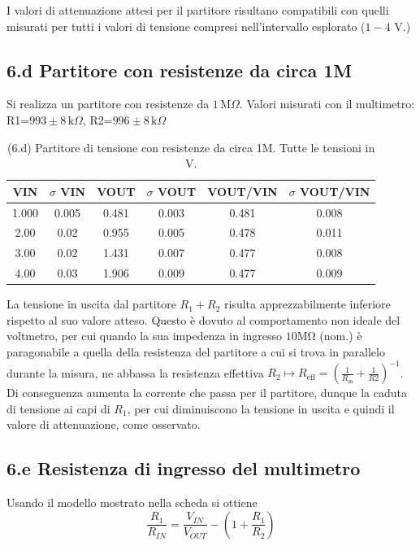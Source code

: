 \documentclass[10pt, a4paper, italian]{article}
\begin{document}
I valori di attenuazione attesi per il partitore risultano compatibili
con quelli misurati per tutti i valori di tensione compresi nell'intervallo
esplorato ($1 - 4$ V.)

\subsection*{6.d Partitore con resistenze da circa 1M}
\par
Si realizza un partitore con resistenze da $1 \,\mathrm{M}\Omega$.
Valori misurati con il multimetro: R1=$993 \pm 8 \,\mathrm{k}\Omega$,
R2=$996 \pm 8 \,\mathrm{k}\Omega$


\begin{table}[h]
\centering
\begin{tabular}{|c|c|c|c|c|c|}
\hline 
VIN& $\sigma$ VIN  &VOUT	 & $\sigma$ VOUT& VOUT/VIN & $\sigma$ VOUT/VIN \\
\hline 
1.000 & 0.005 & 0.481 & 0.003 & 0.481 & 0.008 \\
2.00 & 0.02 & 0.955 & 0.005 & 0.478 & 0.011 \\
3.00 & 0.02 & 1.431 & 0.007 & 0.477 & 0.008 \\
4.00 & 0.03 & 1.906 & 0.009 & 0.477 & 0.009 \\
\hline 
\end{tabular} 
\caption{(6.d) Partitore di tensione con resistenze da circa 1M.
Tutte le tensioni in V.\label{tab:div1M}}
\end{table}

La tensione in uscita dal partitore $R_1 + R_2$ risulta apprezzabilmente
inferiore rispetto al suo valore atteso. Questo è dovuto al comportamento
non ideale del voltmetro, per cui quando la sua impedenza in ingresso
$10 \si{\Mohm}$ (nom.) è paragonabile a quella della resistenza del partitore
a cui si trova in parallelo durante la misura, ne abbassa la resistenza
effettiva $R_2 \mapsto R_{\mathrm{eff}} = (\frac{1}{R_{\mathrm{in}}}
+ \frac{1}{R2})^{-1}$. Di conseguenza aumenta la corrente che passa per
il partitore, dunque la caduta di tensione ai capi di $R_1$, per cui
diminuiscono la tensione in uscita e quindi il valore di attenuazione, come
osservato.


\subsection*{6.e Resistenza di ingresso del multimetro}
Usando il modello mostrato nella scheda si ottiene
\begin{equation}\label{eq: divider}
\frac{R_1}{R_{IN}} =  \frac{V_{IN}}{V_{OUT}} - (1 +  \frac{R_1}{R_2} )
\end{equation}
\end{document}
